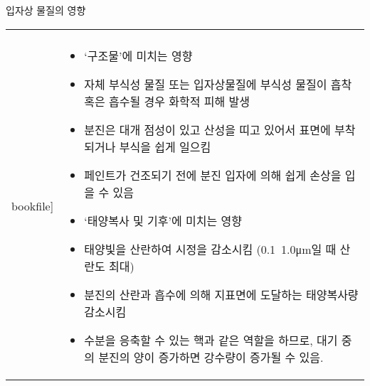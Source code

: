 \begin{frame}[t]{입자상 물질의 영향}
	\begin{tabular}{ll}
		\begin{minipage}[t]{0.3\textwidth}\scriptsize
			\begin{figure}[t]
				\texttt{[image: \\bookfile]}
			\end{figure}
		\end{minipage}	
		&
		\begin{minipage}[t]{0.65\textwidth} \scriptsize	
			\begin{itemize}
				\item ‘구조물’에 미치는 영향
				\item 자체 부식성 물질 또는 입자상물질에 부식성 물질이 흡착 혹은 흡수될 경우 화학적 피해 발생 
				\item 분진은 대개 점성이 있고 산성을 띠고 있어서 표면에 부착되거나 부식을 쉽게 일으킴
				\item 페인트가 건조되기 전에 분진 입자에 의해 쉽게 손상을 입을 수 있음
				
				\item ‘태양복사 및 기후’에 미치는 영향
				\item 태양빛을 산란하여 시정을 감소시킴 (0.1~1.0μm일 때 산란도 최대)
				\item 분진의 산란과 흡수에 의해 지표면에 도달하는 태양복사량 감소시킴
				\item 수분을 응축할 수 있는 핵과 같은 역할을 하므로, 대기 중의 분진의 양이 증가하면 강수량이 증가될 수 있음.
				
			\end{itemize}

		\end{minipage}
	\end{tabular}
\end{frame}



